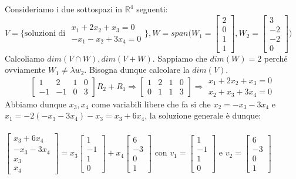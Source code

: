 \begin{example}
Consideriamo i due sottospazi in $\mathbb{R}^4$ seguenti:\\
$V= \Big\{\text{soluzioni di } \begin{array}{l}x_1 + 2x_2 + x_3 = 0\\-x_1 -x_2 + 3x_4 = 0\end{array}\Big\}, W = span\Bigg(W_1 = \begin{bmatrix}2\\0\\1\\1\end{bmatrix}, W_2 = \begin{bmatrix}3\\-2\\-2\\0\end{bmatrix}\Bigg)$\\
Calcoliamo $dim(V \cap W), dim(V + W)$. Sappiamo che $dim(W)=2$ perché ovviamente $W_1 \neq \lambda w_2$. Bisogna dunque calcolare la $dim(V)$.
\[
\begin{bmatrix}
1 & 2 & 1 & 0\\
-1 & -1 & 0 & 3
\end{bmatrix}
R_2 + R_1
\Rightarrow
\begin{bmatrix}
1 & 2 & 1 & 0\\
0 & 1 & 1 & 3
\end{bmatrix}
\Rightarrow
\begin{array}{l}
    x_1 + 2x_2 + x_3 = 0\\
    x_2 + x_3 + 3x_4 = 0
\end{array}
\]
Abbiamo dunque $x_3, x_4$ come variabili libere che fa si che $x_2 = -x_3 - 3 x_4$ e $x_1 = -2(-x_3 -3x_4) - x_3 = x_3 + 6x_4$, la soluzione generale è dunque:\\\\ $\begin{bmatrix}x_3 + 6x_4 \\ -x_3 - 3x_4 \\ x_3 \\ x_4\end{bmatrix} = x_3\begin{bmatrix}1\\-1\\1\\0\end{bmatrix} + x_4\begin{bmatrix}6\\-3\\0\\1\end{bmatrix}$ \hspace{.5cm} con $v_1 = \begin{bmatrix}1\\-1\\1\\0\end{bmatrix}$ e $v_2 = \begin{bmatrix}6\\-3\\0\\1\end{bmatrix}$ \\\\

\end{example}
